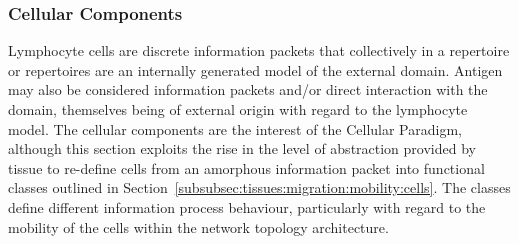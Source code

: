 %
%
\subsubsection{Cellular Components}
\label{subsec:tissues:paradigm:models:cells}
Lymphocyte cells are discrete information packets that collectively in a repertoire or repertoires are an internally generated model of the external domain. Antigen may also be considered information packets and/or direct interaction with the domain, themselves being of external origin with regard to the lymphocyte model. The cellular components are the interest of the Cellular Paradigm, although this section exploits the rise in the level of abstraction provided by tissue to re-define cells from an amorphous information packet into functional classes outlined in Section~\ref{subsubsec:tissues:migration:mobility:cells}. The classes define different information process behaviour, particularly with regard to the mobility of the cells within the network topology architecture.

%
%
